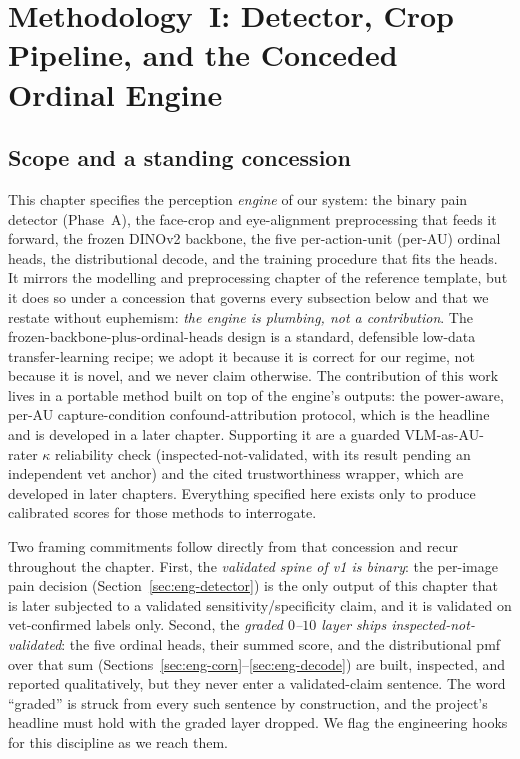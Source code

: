 
\chapter{Methodology~I: Detector, Crop Pipeline, and the Conceded Ordinal Engine}
\label{ch:methodology-engine}

\section{Scope and a standing concession}
\label{sec:eng-scope}

This chapter specifies the perception \emph{engine} of our system: the binary
pain detector (Phase~A), the face-crop and eye-alignment preprocessing that
feeds it forward, the frozen DINOv2 backbone, the five per-action-unit (per-AU)
ordinal heads, the distributional decode, and the training procedure that fits
the heads. It mirrors the modelling and preprocessing chapter of the reference
template, but it does so under a concession that governs every subsection below
and that we restate without euphemism: \emph{the engine is plumbing, not a
contribution}. The frozen-backbone-plus-ordinal-heads design is a standard,
defensible low-data transfer-learning recipe; we adopt it because it is correct
for our regime, not because it is novel, and we never claim otherwise. The
contribution of this work lives in a portable method built on top of the
engine's outputs: the power-aware, per-AU capture-condition
confound-attribution protocol, which is the headline and is developed in a later
chapter. Supporting it are a guarded VLM-as-AU-rater $\kappa$ reliability check
(inspected-not-validated, with its result pending an independent vet anchor) and
the cited trustworthiness wrapper, which are developed in later chapters.
Everything specified here exists only to
produce calibrated scores for those methods to interrogate.

Two framing commitments follow directly from that concession and recur
throughout the chapter. First, the \emph{validated spine of v1 is binary}: the
per-image pain decision (Section~\ref{sec:eng-detector}) is the only output of
this chapter that is later subjected to a validated sensitivity/specificity
claim, and it is validated on vet-confirmed labels only. Second, the
\emph{graded $0$--$10$ layer ships inspected-not-validated}: the five ordinal
heads, their summed score, and the distributional pmf over that sum
(Sections~\ref{sec:eng-corn}--\ref{sec:eng-decode}) are built, inspected, and
reported qualitatively, but they never enter a validated-claim sentence. The
word ``graded'' is struck from every such sentence by construction, and the
project's headline must hold with the graded layer dropped. We flag the
engineering hooks for this discipline as we reach them.

